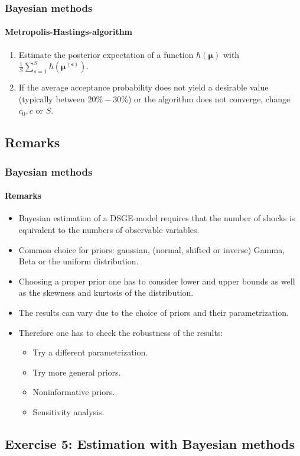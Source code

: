 \documentclass{beamer} %
\newcounter{saveenumi}
\newcommand{\conti}{\setcounter{enumi}{\value{saveenumi}}}
\begin{document}
\begin{frame}\frametitle{Bayesian methods}\framesubtitle{Metropolis-Hastings-algorithm}
\begin{enumerate}\conti
  \item Estimate the posterior expectation of a function
      $\hbar(\boldsymbol{\mu})$ with $\frac{1}{S}\sum_{s=1}^S
      \hbar\left(\boldsymbol{\mu^{(s)}}\right)$.
  \item If the average acceptance probability does not yield a desirable value (typically between $20\%-30\%$) or the algorithm does not converge, change $c_0,c$ or $S$.
\end{enumerate}

\end{frame}

\subsection{Remarks}
\begin{frame}\frametitle{Bayesian methods}\framesubtitle{Remarks}
  \begin{itemize}
    \item Bayesian estimation of a DSGE-model requires that the number of shocks is equivalent to the numbers of observable variables.
    \item Common choice for priors: gaussian, (normal, shifted or inverse) Gamma, Beta or the uniform distribution.
    \item Choosing a proper prior one has to consider lower and upper bounds as well as the skewness and kurtosis of the distribution.
    \item The results can vary due to the choice of priors and their parametrization.
    \item Therefore one has to check the robustness of the results:
    \begin{itemize}
      \item Try a different parametrization.
      \item Try more general priors.
      \item Noninformative priors.
      \item Sensitivity analysis.
    \end{itemize}
  \end{itemize}
\end{frame}

\subsection{Exercise 5: Estimation with Bayesian methods}
\end{document}
